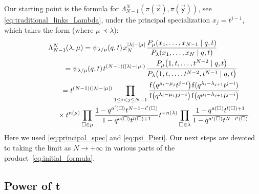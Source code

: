 Our starting point is the formula for
$\Lambda^{N}_{N-1}(\pi(\vec{\mathsf{x}}),\overline\pi(\vec{\mathsf{y}}))$, see
\eqref{eq:traditional_links_Lambda},
under the principal
specialization $x_j=t^{j-1}$, which takes the form (where $\mu\prec\lambda$):
\begin{gather}
	\nonumber
		\Lambda^{N}_{N-1}(\lambda,\mu)
		=
		\psi_{\lambda/\mu}(q,t)\hspace{1pt} x_N^{|\lambda|-|\mu|}\hspace{1pt}
		\frac{
		P_\mu(x_1,\dots,x_{N-1} \mid q,t )
		}
		{P_\lambda(x_1,\dots,x_N \mid q,t)}
		\\
		\nonumber
\hphantom{\Lambda^{N}_{N-1}(\lambda,\mu)}{}
=
		\psi_{\lambda/\mu}
		(q,t)\hspace{1pt}
		t^{(N-1)(|\lambda|-|\mu|)}\hspace{1pt}
		\frac{P_\mu\big(1,t,\dots,t^{N-2}\mid q,t \big)}{P_\lambda\big(1,t,\dots,t^{N-2},t^{N-1}\mid q,t\big)}
		\\
		\nonumber
\hphantom{\Lambda^{N}_{N-1}(\lambda,\mu)}{}
=
		t^{(N-1)(|\lambda|-|\mu|)}
		\prod_{1\le i<j\le N-1}
		\frac{\mathsf{f}\big(q^{\mu_i-\mu_j}t^{j-i}\big)\hspace{1pt}
		\mathsf{f}(q^{\lambda_i-\lambda_{j+1}}t^{j-i})}
		{\mathsf{f}\big(q^{\lambda_i-\mu_j}t^{j-i}\big)\hspace{1pt}
		\mathsf{f}\big(q^{\mu_i-\lambda_{j+1}}t^{j-i}\big)}
		\\
\hphantom{\Lambda^{N}_{N-1}(\lambda,\mu)=}{}
\times
		t^{n(\mu)}\prod_{\square\in \mu}
		\frac{1-q^{a'(\square)}t^{N-1-l'(\square)}}
		{1-q^{a(\square)}t^{l(\square)+1}}
		t^{-n(\lambda)}
		\prod_{\square\in \lambda}
		\frac
		{1-q^{a(\square)}t^{l(\square)+1}}
		{1-q^{a'(\square)}t^{N-l'(\square)}}.		\label{eq:initial_formula}
\end{gather}
Here we used
\eqref{eq:principal_spec} and
\eqref{eq:psi_Pieri}.
Our next steps are devoted to
taking the limit as
$N\to+\infty$
in various parts of the product~\eqref{eq:initial_formula}.

\subsection[Power of t]{Power of $\boldsymbol{t}$}

